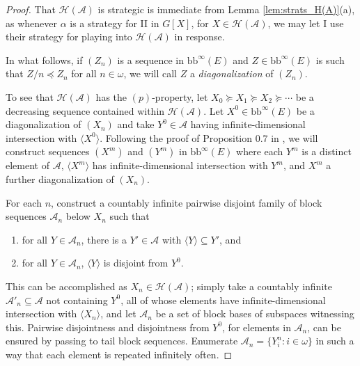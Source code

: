 \documentclass[11pt]{amsart}
\newcommand{\LA}{\mathcal{A}}
\theoremstyle{definition}
\theoremstyle{remark}
\newcommand{\LH}{\mathcal{H}}
\newcommand{\bb}{\mathrm{bb}}
\renewcommand{\1}{\mathbf{1}}
\begin{document}
\begin{proof}
	That $\LH(\LA)$ is strategic is immediate from Lemma \ref{lem:strats_H(A)}(a), as whenever $\alpha$ is a strategy for II in $G[X]$, for $X\in\LH(\LA)$, we may let I use their strategy for playing into $\LH(\LA)$ in response.
	
	In what follows, if $(Z_n)$ is a sequence in $\bb^\infty(E)$ and $Z\in\bb^\infty(E)$ is such that $Z/n\preceq Z_n$ for all $n\in\omega$, we will call $Z$ a \emph{diagonalization} of $(Z_n)$. 
	
	To see that $\LH(\LA)$ has the $(p)$-property, let $X_0\succeq X_1\succeq X_2\succeq\cdots$ be a decreasing sequence contained within $\LH(\LA)$. Let $X^0\in\bb^\infty(E)$ be a diagonalization of $(X_n)$ and take $Y^0\in\LA$ having infinite-dimensional intersection with $\langle X^0\rangle$.  Following the proof of Proposition 0.7 in \cite{MR0491197}, we will construct sequences $(X^m)$ and $(Y^m)$ in $\bb^\infty(E)$ where each $Y^m$ is a distinct element of $\LA$, $\langle X^m\rangle$ has infinite-dimensional intersection with $Y^m$, and $X^m$ a further diagonalization of $(X_n)$.%
	
	
	For each $n$, construct a countably infinite pairwise disjoint family of block sequences $\LA_n$ below $X_n$ such that
	\begin{enumerate}[label=\rm{(\roman*)}]
		\item for all $Y\in\LA_n$, there is a $Y'\in\LA$ with $\langle Y\rangle\subseteq Y'$, and
		\item for all $Y\in\LA_n$, $\langle Y\rangle$ is disjoint from $Y^0$.
	\end{enumerate}
	This can be accomplished as $X_n\in\LH(\LA)$; simply take a countably infinite $\LA'_n\subseteq\LA$ not containing $Y^0$, all of whose elements have infinite-dimensional intersection with $\langle X_n\rangle$, and let $\LA_n$ be a set of block bases of subspaces witnessing this. Pairwise disjointness and disjointness from $Y^0$, for elements in $\LA_n$, can be ensured by passing to tail block sequences. Enumerate $\LA_n=\{Y^n_i:i\in\omega\}$ in such a way that each element is repeated infinitely often.
	

\end{proof}
\end{document}

